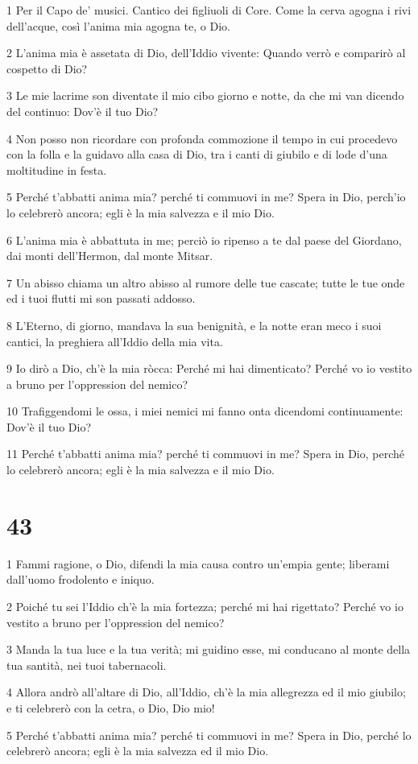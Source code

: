 \par 1 Per il Capo de' musici. Cantico dei figliuoli di Core. Come la cerva agogna i rivi dell'acque, così l'anima mia agogna te, o Dio.
\par 2 L'anima mia è assetata di Dio, dell'Iddio vivente: Quando verrò e comparirò al cospetto di Dio?
\par 3 Le mie lacrime son diventate il mio cibo giorno e notte, da che mi van dicendo del continuo: Dov'è il tuo Dio?
\par 4 Non posso non ricordare con profonda commozione il tempo in cui procedevo con la folla e la guidavo alla casa di Dio, tra i canti di giubilo e di lode d'una moltitudine in festa.
\par 5 Perché t'abbatti anima mia? perché ti commuovi in me? Spera in Dio, perch'io lo celebrerò ancora; egli è la mia salvezza e il mio Dio.
\par 6 L'anima mia è abbattuta in me; perciò io ripenso a te dal paese del Giordano, dai monti dell'Hermon, dal monte Mitsar.
\par 7 Un abisso chiama un altro abisso al rumore delle tue cascate; tutte le tue onde ed i tuoi flutti mi son passati addosso.
\par 8 L'Eterno, di giorno, mandava la sua benignità, e la notte eran meco i suoi cantici, la preghiera all'Iddio della mia vita.
\par 9 Io dirò a Dio, ch'è la mia ròcca: Perché mi hai dimenticato? Perché vo io vestito a bruno per l'oppression del nemico?
\par 10 Trafiggendomi le ossa, i miei nemici mi fanno onta dicendomi continuamente: Dov'è il tuo Dio?
\par 11 Perché t'abbatti anima mia? perché ti commuovi in me? Spera in Dio, perché lo celebrerò ancora; egli è la mia salvezza e il mio Dio.

\chapter{43}

\par 1 Fammi ragione, o Dio, difendi la mia causa contro un'empia gente; liberami dall'uomo frodolento e iniquo.
\par 2 Poiché tu sei l'Iddio ch'è la mia fortezza; perché mi hai rigettato? Perché vo io vestito a bruno per l'oppression del nemico?
\par 3 Manda la tua luce e la tua verità; mi guidino esse, mi conducano al monte della tua santità, nei tuoi tabernacoli.
\par 4 Allora andrò all'altare di Dio, all'Iddio, ch'è la mia allegrezza ed il mio giubilo; e ti celebrerò con la cetra, o Dio, Dio mio!
\par 5 Perché t'abbatti anima mia? perché ti commuovi in me? Spera in Dio, perché lo celebrerò ancora; egli è la mia salvezza ed il mio Dio.

